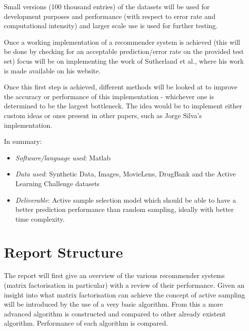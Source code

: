 Small versions (100 thousand entries) of the datasets will be used for development purposes and performance (with respect to error rate and computational intensity) and larger scale use is used for further testing.

Once a working implementation of a recommender system is achieved (this will be done by checking for an acceptable prediction/error rate on the provided test set) focus will be on implementing the work of Sutherland et al.\cite{active-mf}, where his work is made available on his website.

Once this first step is achieved, different methods will be looked at to improve the accuracy or performance of this implementation -  whichever one is determined to be the largest bottleneck. The idea would be to implement either custom ideas or ones present in other papers, such as Jorge Silva's\cite{silva} implementation.

In summary:
\begin{itemize}
\item \textit{Software/language used}: Matlab
\item \textit{Data used}: Synthetic Data, Images, MovieLens, DrugBank and the Active Learning Challenge datasets
\item \textit{Deliverable}: Active sample selection model which should be able to have a better prediction performance than random sampling, ideally with better time complexity.
\end{itemize}

\section{Report Structure}
The report will first give an overview of the various recommender systems (matrix factorisation in particular) with a review of their performance. Given an insight into what matrix factorisation can achieve the concept of active sampling will be introduced by the use of a very basic algorithm. From this a more advanced algorithm is constructed and compared to other already existent algorithm. Performance of each algorithm is compared.


